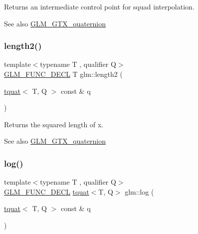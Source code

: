 Returns an intermediate control point for squad interpolation.

\begin{DoxySeeAlso}{See also}
\hyperlink{group__gtx__quaternion}{G\+L\+M\+\_\+\+G\+T\+X\+\_\+quaternion} 
\end{DoxySeeAlso}
\mbox{\label{group__gtx__quaternion_ga229bacc3051770b030042fe266f7b0cb}} 
\subsubsection{\texorpdfstring{length2()}{length2()}}
{\footnotesize\ttfamily template$<$typename T , qualifier Q$>$ \\
\hyperlink{setup_8hpp_ab2d052de21a70539923e9bcbf6e83a51}{G\+L\+M\+\_\+\+F\+U\+N\+C\+\_\+\+D\+E\+CL} T glm\+::length2 (\begin{DoxyParamCaption}\item[{\hyperlink{structglm_1_1tquat}{tquat}$<$ T, Q $>$ const \&}]{q }\end{DoxyParamCaption})}

Returns the squared length of x.

\begin{DoxySeeAlso}{See also}
\hyperlink{group__gtx__quaternion}{G\+L\+M\+\_\+\+G\+T\+X\+\_\+quaternion} 
\end{DoxySeeAlso}
\mbox{\label{group__gtx__quaternion_gaad510f1a4ea26994b341c094ec4f4eed}} 
\subsubsection{\texorpdfstring{log()}{log()}}
{\footnotesize\ttfamily template$<$typename T , qualifier Q$>$ \\
\hyperlink{setup_8hpp_ab2d052de21a70539923e9bcbf6e83a51}{G\+L\+M\+\_\+\+F\+U\+N\+C\+\_\+\+D\+E\+CL} \hyperlink{structglm_1_1tquat}{tquat}$<$T, Q$>$ glm\+::log (\begin{DoxyParamCaption}\item[{\hyperlink{structglm_1_1tquat}{tquat}$<$ T, Q $>$ const \&}]{q }\end{DoxyParamCaption})}

